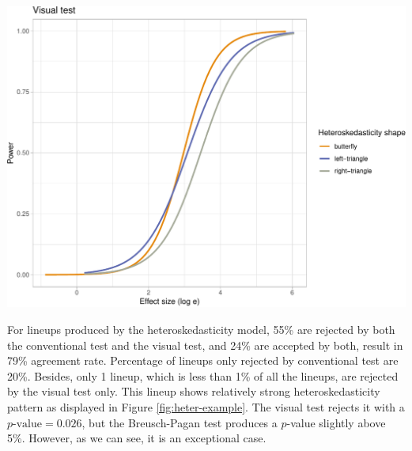 \documentclass[]{interact}
\theoremstyle{plain}%
\theoremstyle{definition}
\theoremstyle{remark}
\begin{document}
\begin{center}\includegraphics[width=1\linewidth]{paper_comparison_files/figure-latex/unnamed-chunk-13-1} \end{center}

For lineups produced by the heteroskedasticity model, 55\% are rejected
by both the conventional test and the visual test, and 24\% are accepted
by both, result in 79\% agreement rate. Percentage of lineups only
rejected by conventional test are 20\%. Besides, only 1 lineup, which is
less than 1\% of all the lineups, are rejected by the visual test only.
This lineup shows relatively strong heteroskedasticity pattern as
displayed in Figure \ref{fig:heter-example}. The visual test rejects it
with a \(p\text{-value} = 0.026\), but the Breusch-Pagan test produces a
\(p\)-value slightly above 5\%. However, as we can see, it is an
exceptional case.
\end{document}
